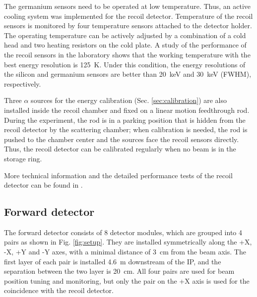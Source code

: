 \documentclass[number,5p]{elsarticle}
\begin{document}
The germanium sensors need to be operated at low temperature.
Thus, an active cooling system was implemented for the recoil detector.
Temperature of the recoil sensors is monitored by four temperature sensors attached to the detector holder.
The operating temperature can be actively adjusted by a combination of a cold head and two heating resistors on the cold plate.
A study of the performance of the recoil sensors in the laboratory shows that the
working temperature with the best energy resolution is \SI{125}{\kelvin}.
Under this condition, the energy resolutions of the silicon and germanium
sensors are better than \SI{20}{\keV} and \SI{30}{\keV} (FWHM), respectively.

Three $\alpha$ sources for the energy calibration (Sec. \ref{sec:calibration}) are also installed inside the recoil chamber and fixed on a linear motion feedthrough rod.
During the experiment, the rod is in a parking position that is hidden from the
recoil detector by the scattering chamber;
when calibration is needed, the rod is pushed to the chamber center and the sources face the recoil sensors directly.
Thus, the recoil detector can be calibrated regularly when no beam is in the storage ring.

More technical information and the detailed performance tests of the recoil detector can be found in \cite{recoil_article}.

\subsection{Forward detector}
\label{sec:fwd}


The forward detector consists of 8 detector modules, which are
grouped into 4 pairs as shown in Fig. \ref{fig:setup}.
They are installed symmetrically along the +X, -X, +Y and -Y axes, with a minimal distance of \SI{3}{\cm} from the beam axis.
The first layer of each pair is installed \SI{4.6}{\meter} downstream of the IP, and the separation between the two layer is \SI{20}{\cm}.
All four pairs are used for beam position tuning and monitoring, but only the
pair on the +X axis is used for the coincidence with the recoil detector.
\end{document}
